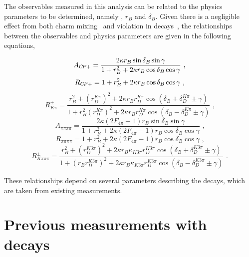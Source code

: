 The \CP observables measured in this analysis can be related to the physics parameters to be determined, namely \Pgamma, $r_B$ and $\delta_B$. Given there is a negligible effect from both charm mixing~\cite{charmmixing} and \CP violation in \D decays~\cite{charmcpv}, the relationships between the \CP observables and physics parameters are given in the following equations,

\begin{equation}
A_{{C\!P}+} = \frac{2 \kappa r_B\sin\delta_B\sin\gamma}{1 + r_B^2 + 2 \kappa r_B\cos\delta_B\cos\gamma} \text{ ,}
\label{exp_Acp}
\end{equation}
\begin{equation}
R_{{C\!P}+} = 1 + r_B^2 + 2 \kappa r_B\cos\delta_B\cos\gamma \text{ ,}
\label{exp_Rcp}
\end{equation}
\begin{equation}
R^{\pm}_{K\pi} = \frac{r_B^2 + \left(r_D^{K\pi}\right)^2 + 2\kappa r_B r_D^{K\pi} \cos(\delta_B + \delta_D^{K\pi} \pm \gamma)}{1 + r_B^2\left(r_D^{K\pi}\right)^2 + 2\kappa r_B r_D^{K\pi} \cos(\delta_B - \delta_D^{K\pi} \pm \gamma)} \text{ ,}
\label{exp_Rpm}
\end{equation}
\begin{equation}
A_{\pi\pi\pi\pi} = \frac{2 \kappa\left(2F_{4\pi} - 1\right) r_B\sin\delta_B\sin\gamma}{1 + r_B^2 + 2 \kappa\left(2F_{4\pi} - 1\right) r_B\cos\delta_B\cos\gamma} \text{ ,}
\label{exp_A4pi}
\end{equation}
\begin{equation}
R_{\pi\pi\pi\pi} = 1 + r_B^2 + 2 \kappa\left(2F_{4\pi} - 1\right) r_B\cos\delta_B\cos\gamma \text{ ,}
\label{exp_R4pi}
\end{equation}
\begin{equation}
R^{\pm}_{K\pi\pi\pi} = \frac{r_B^2 + \left(r_D^{K3\pi}\right)^2 + 2\kappa r_B \kappa_{K3\pi} r_D^{K3\pi} \cos(\delta_B + \delta_D^{K3\pi} \pm \gamma)}{1 + \left(r_Br_D^{K3\pi}\right)^2 + 2\kappa r_B \kappa_{K3\pi} r_D^{K3\pi} \cos(\delta_B - \delta_D^{K3\pi} \pm \gamma)} \text{ .}
\label{exp_Rpm4body}
\end{equation}

These relationships depend on several parameters describing the \D decays, which are taken from existing measurements.


\section{Previous \Pgamma measurements with  decays}

